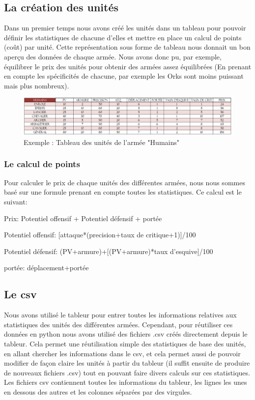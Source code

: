\documentclass{article}
\begin{document}
 \subsection{La création des unités}
 Dans un premier temps nous avons créé les unités dans un tableau pour pouvoir définir les statistiques de chacune d'elles et mettre en place un calcul de points (coût) par unité. Cette représentation sous forme de tableau nous donnait un bon aperçu des données de chaque armée. Nous avons donc pu, par exemple, équilibrer le prix des unités pour obtenir des armées assez équilibrées (En prenant en compte les spécificités de chacune, par exemple les Orks sont moins puissant mais plus nombreux).
 \begin{figure}
 \center
 \includegraphics[scale=0.6]{../images/tableau.png}
 \caption{Exemple : Tableau des unités de l'armée "Humains"} 
 \end{figure}
 
  
  \subsubsection{Le calcul de points}
  Pour calculer le prix de chaque unités des différentes armées, nous nous sommes basé sur une formule prenant en compte toutes les statistiques. Ce calcul est le suivant: 
  
  \begin{flushleft}
   Prix: Potentiel offensif + Potentiel défensif + portée
  
  Potentiel offensif: [attaque*(precision+taux de critique+1)]/100
 
  Potentiel défensif: (PV+armure)+[(PV+armure)*taux d'esquive]/100
  
  portée: déplacement+portée
  \end{flushleft}
  
  \subsection{Le csv}
Nous avons utilisé le tableur pour entrer toutes les informations relatives aux statistiques des unités des différentes armées. Cependant, pour réutiliser ces données en python nous avons utilisé des fichiers .csv créés directement depuis le tableur. Cela permet une réutilisation simple des statistiques de base des unités, en allant chercher les informations dans le csv, et cela permet aussi de pouvoir modifier de façon claire les unités à partir du tableur (il suffit ensuite de produire de nouveaux fichiers .csv) tout en pouvant faire divers calculs sur ces statistiques. Les fichiers csv contiennent toutes les informations du tableur, les lignes les unes en dessous des autres et les colonnes séparées par des virgules. 
  
\end{document}
